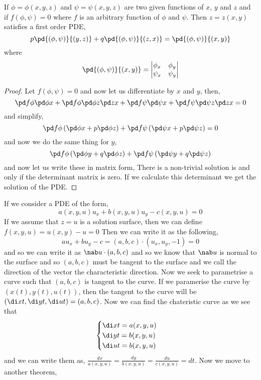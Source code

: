 \begin{nthm}[]
  If $\phi = \phi(x, y, z)$ and $\psi = \psi(x, y, z)$ are two given functions of $x$, $y$ and $z$ and if $f(\phi, \psi) = 0$ where $f$ is an arbitrary function of $\phi$ and $\psi$. Then $z = z(x, y)$ satisfies a first order PDE,
  $$ p\pd{(\phi, \psi)}{(y, z)} + q\pd{(\phi, \psi)}{(z, x)} = \pd{(\phi, \psi)}{(x, y)} $$
  where
  $$ \pd{(\phi, \psi)}{(x, y)} = \left| \begin{matrix}
    \phi_x & \phi_y \\ \psi_x & \psi_y
  \end{matrix} \right| $$
\end{nthm}
\begin{proof}
  Let $f(\phi, \psi) = 0$ and now let us differentiate by $x$ and $y$, then,
  $$ \pd f \phi \pd \phi x + \pd f \phi\pd \phi z \pd z x + \pd f \psi \pd \psi x + \pd f \psi \pd \psi z \pd z x = 0 $$
  and simplify,
  $$ \pd f \phi \left( \pd \phi x + p\pd \phi z \right) + \pd f \psi \left(\pd \psi x + p\pd \psi z\right) = 0 $$
  and now we do the same thing for $y$,
  $$ \pd f \phi \left( \pd \phi y + q\pd \phi z \right) + \pd f \psi \left( \pd \psi y + q\pd \psi z\right) $$
  and now let us write these in matrix form,
  There is a non-trivial solution is and only if the  determinant matrix is zero. If we calculate this determinant we get the solution of the PDE.
\end{proof}

If we consider a PDE of the form,
$$ a(x, y, u)u_x + b(x, y, u)u_y - c(x, y, u) = 0 $$
If we assume that $z = u$ is a solution surface, then we can define $f(x, y, u) = u(x, y) - u = 0$
Then we can write it as the following,
$$ au_x + bu_y - c = (a, b, c) \cdot (u_x, u_y, -1) = 0 $$
and so we can write it as $\nab u \cdot (a, b, c)$ and so we know that $\nab u$ is normal to the surface and so $(a, b, c)$ must be tangent to the surface and we call the direction of the vector the characteristic direction. Now we seek to parametrise a curve such that $(a, b, c)$ is tangent to the curve. If we paramerise the curve by $(x(t), y(t), u(t))$, then the tangent to the curve will be $(\di x t, \di y t, \di u t) = (a, b, c)$. Now we can find the chateristic curve as we see that
$$ \begin{cases}
  \di x t = a(x, y, u)\\
  \di y t = b(x, y, u)\\
  \di u t = b(x, y, u)
\end{cases} $$
and we can write them as, $\frac{dx}{a(x, y, u)} = \frac{dy}{b(x, y, u)} = \frac{du}{c(x, y, u)} = dt$. Now we move to another theorem,

